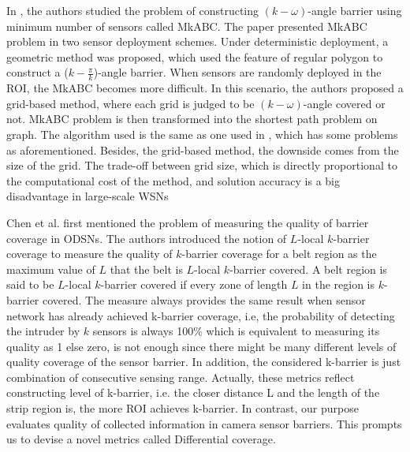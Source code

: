 In \cite{xu2016minimum}, the authors studied the problem of constructing $(k-\omega)$-angle barrier using minimum number of sensors called MkABC. The paper presented MkABC problem in two sensor deployment schemes. Under deterministic deployment, a geometric method was proposed, which used the feature of regular polygon to construct a ($k-\displaystyle\frac{\pi}{k}$)-angle barrier. When sensors are randomly deployed in the ROI, the MkABC becomes more difficult. In this scenario, the authors proposed a grid-based method, where each grid is judged to be $(k-\omega)$-angle covered or not. MkABC problem is then transformed into the shortest path problem on graph. The algorithm used is the same as one used in \cite{ma2012minimum}, which has some problems as aforementioned. Besides, the grid-based method, the downside comes from the size of the grid. The trade-off between grid size, which is directly proportional to the computational cost of the method, and solution accuracy is
a big disadvantage in large-scale WSNs 

Chen et al. \cite{chen2008measuring} first mentioned the problem of measuring the quality of barrier coverage in ODSNs. The authors introduced the notion of $L$-local $k$-barrier coverage to measure the quality of $k$-barrier coverage for a belt region as the maximum value of $L$ that the belt is $L$-local $k$-barrier covered. A belt region is said to be $L$-local $k$-barrier covered if every zone of length $L$ in the region is $k$-barrier covered. The measure always provides the same result when sensor network has already achieved k-barrier coverage, i.e, the probability of detecting the intruder by $k$ sensors is always 100\% which is equivalent to measuring its quality as 1 else zero, is not enough since there might be many different levels of quality coverage of the sensor barrier.  In addition, the considered k-barrier is just combination of consecutive sensing range. Actually, these metrics reflect constructing level of k-barrier, i.e. the closer distance L and the length of the strip region is, the more ROI achieves k-barrier. In contrast, our purpose evaluates quality of collected information in camera sensor barriers. This prompts us to devise a novel metrics called Differential coverage.  

